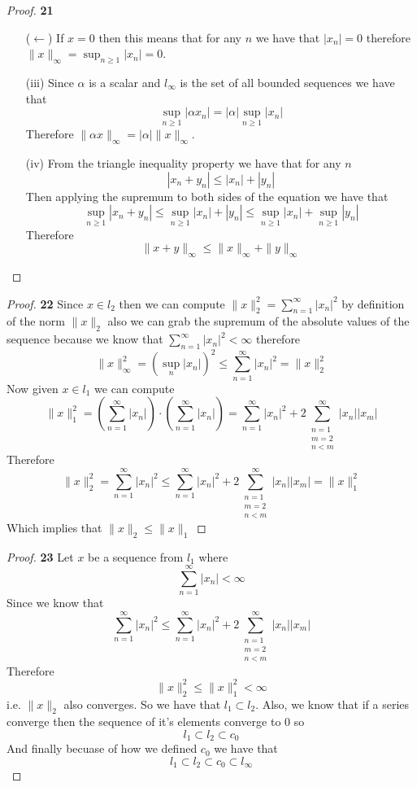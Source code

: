 \documentclass[11pt]{article}
\theoremstyle{definition}
\begin{document}
\begin{proof}{\textbf{21}}
\begin{itemize}
            ($\leftarrow$) If $x=0$ then this means that for any $n$ we have that
            $|x_n| = 0$ therefore $\|x\|_\infty = \sup_{n\geq 1} |x_n| = 0$.
            \item [(iii)] Since $\alpha$ is a scalar and $l_\infty$ is the set of all
            bounded sequences we have that
            $$\sup_{n \geq 1} |\alpha x_n| = |\alpha| \sup_{n \geq 1} |x_n|$$
            Therefore $\|\alpha x\|_\infty = |\alpha|\|x\|_\infty$.
            \item [(iv)] From the triangle inequality property we have that for any $n$
            $$|x_n + y_n| \leq |x_n| + |y_n|$$
            Then applying the supremum to both sides of the equation we have that
            $$\sup_{n\geq 1}|x_n + y_n| \leq \sup_{n\geq 1} |x_n| + |y_n|
            \leq \sup_{n\geq 1} |x_n| + \sup_{n\geq 1} |y_n|$$
            Therefore
            $$\|x + y\|_\infty \leq \|x\|_\infty + \|y\|_\infty$$
        \end{itemize}
    \end{proof}
	\begin{proof}{\textbf{22}}
       Since $x \in l_2$ then we can compute $\|x\|_2^2 = \sum_{n=1}^\infty |x_n|^2$ by
       definition of the norm $\|x\|_2$ also we can grab the supremum of the absolute
       values of the sequence because we know that $\sum_{n=1}^\infty |x_n|^2 < \infty$
       therefore
       $$\|x\|_\infty^2 = (\sup_{n} |x_n|)^2 \leq
        \sum_{n=1}^\infty |x_n|^2 = \|x\|_2^2$$
        Now given $x \in l_1$ we can compute
        $$\|x\|_1^2 = (\sum_{n=1}^\infty |x_n|)\cdot (\sum_{n=1}^\infty |x_n|) =
        \sum_{n=1}^\infty |x_n|^2 + 2 \sum_{\substack{n=1\\m=2\\n<m}}^{\infty} |x_n||x_m|$$
        Therefore
        $$\|x\|_2^2 = \sum_{n=1}^\infty |x_n|^2 \leq
        \sum_{n=1}^\infty |x_n|^2 + 2\sum_{\substack{n=1\\m=2\\n<m}}^{\infty} |x_n||x_m|
        = \|x\|_1^2$$
        Which implies that $\|x\|_2 \leq \|x\|_1$
    \end{proof}
	\begin{proof}{\textbf{23}}
        Let $x$ be a sequence from $l_1$ where
        $$\sum_{n=1}^\infty |x_n| < \infty$$
        Since we know that
        $$\sum_{n=1}^\infty |x_n|^2 \leq
        \sum_{n=1}^\infty |x_n|^2 + 2\sum_{\substack{n=1\\m=2\\n<m}}^{\infty} |x_n||x_m|$$
        Therefore
        $$\|x\|_2^2 \leq \|x\|_1^2 < \infty$$
        i.e. $\|x\|_2$ also converges. So we have that $l_1 \subset l_2$.
        Also, we know that if a series converge then the sequence of it's elements
        converge to 0 so
        $$l_1 \subset l_2 \subset c_0$$
        And finally becuase of how we defined $c_0$ we have that
        $$l_1 \subset l_2 \subset c_0 \subset l_\infty$$
    \end{proof}
\end{document}
